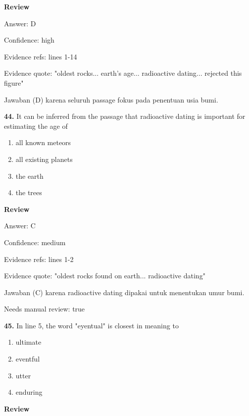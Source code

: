 \documentclass[12pt]{article}
\begin{document}
\par
\begingroup
\setlength{\parskip}{0pt}
\setlength{\parindent}{0pt}
\textbf{Review}\par
Answer: D\par
Confidence: high\par
Evidence refs: lines 1-14\par
Evidence quote: "oldest rocks... earth's age... radioactive dating... rejected this figure"\par
Jawaban (D) karena seluruh passage fokus pada penentuan usia bumi.\par
\endgroup
\par
\vspace{0.25\baselineskip}
\noindent\textbf{44.} It can be inferred from the passage that radioactive dating is important for estimating the age of
\begin{enumerate}[label=(\Alph*),leftmargin=*,itemsep=0.2em]
\item all known meteors
\item all existing planets
\item the earth
\item the trees
\end{enumerate}
\par
\begingroup
\setlength{\parskip}{0pt}
\setlength{\parindent}{0pt}
\textbf{Review}\par
Answer: C\par
Confidence: medium\par
Evidence refs: lines 1-2\par
Evidence quote: "oldest rocks found on earth... radioactive dating"\par
Jawaban (C) karena radioactive dating dipakai untuk menentukan umur bumi.\par
Needs manual review: true\par
\endgroup
\par
\vspace{0.25\baselineskip}
\noindent\textbf{45.} In line 5, the word "eyentual" is closest in meaning to
\begin{enumerate}[label=(\Alph*),leftmargin=*,itemsep=0.2em]
\item ultimate
\item eventful
\item utter
\item enduring
\end{enumerate}
\par
\begingroup
\setlength{\parskip}{0pt}
\setlength{\parindent}{0pt}
\textbf{Review}\par
\end{document}
